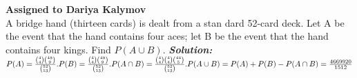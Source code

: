 \documentclass[12pt, a4paper]{article}
\begin{document}
\noindent\textbf{Assigned to Dariya Kalymov}\\

\noindent A bridge hand (thirteen cards) is dealt from a stan dard 52-card deck. Let A be the event that the hand contains four aces; let B be the event that the hand contains four kings. Find
\begin{math}
 P(A \cup B).
 \end{math}
\newline
\textit{\textbf{Solution:}}
\begin{math}
 P(A) = \frac{\binom{4}{4} \binom{48}{9}}{\binom{52}{13}}.\newline 
  P(B) = \frac{\binom{4}{4} \binom{48}{9}}{\binom{52}{13}}.\newline
   P(A \cap B) = \frac{\binom{4}{4} \binom{4}{4} \binom{44}{5}}{\binom{52}{13}}.\newline
  P(A \cup B) = P(A) + P(B)- P(A \cap B) = \frac{4 669 920}{1512}
\end{math}

\newpage
\printbibliography
\end{document}
